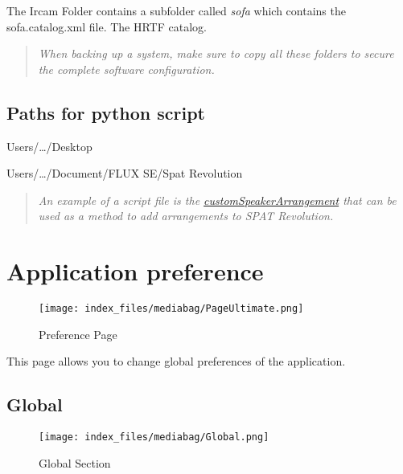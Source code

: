 \documentclass[
  letterpaper,
  DIV=11,
  numbers=noendperiod]{scrreport}
\begin{document}
The Ircam Folder contains a subfolder called \emph{sofa} which contains
the sofa.catalog.xml file. The HRTF catalog.

\begin{quote}
\emph{When backing up a system, make sure to copy all these folders to
secure the complete software configuration.}
\end{quote}

\hypertarget{paths-for-python-script}{%
\section{Paths for python script}\label{paths-for-python-script}}

Users/\ldots/Desktop

Users/\ldots/Document/FLUX SE/Spat Revolution

\begin{quote}
\emph{An example of a script file is the
\href{https://public.3.basecamp.com/p/rQStK3igPkaXisYS4Gs5sJ2g/upload/download/customSpeakerArrangement.py?disposition=attachment}{customSpeakerArrangement}
that can be used as a method to add arrangements to \emph{SPAT
Revolution}.}
\end{quote}


\hypertarget{application-preference}{%
\chapter{Application preference}\label{application-preference}}

\begin{figure}

{\centering \texttt{[image: index\_files/mediabag/PageUltimate.png]}

}

\caption{Preference Page}

\end{figure}

This page allows you to change global preferences of the application.

\hypertarget{global}{%
\section{Global}\label{global}}

\begin{figure}

{\centering \texttt{[image: index\_files/mediabag/Global.png]}

}

\caption{Global Section}

\end{figure}
\end{document}
